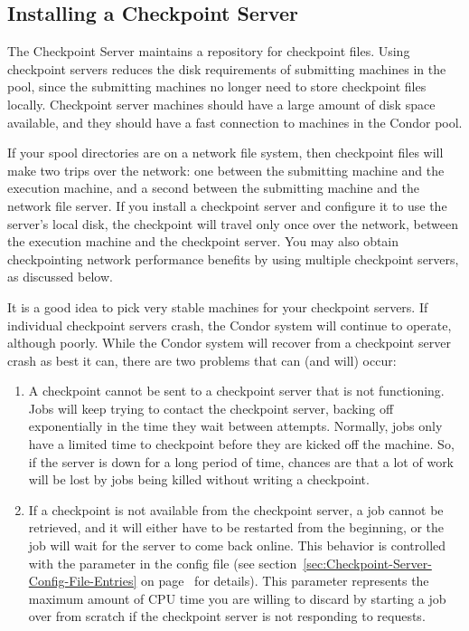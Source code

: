 \subsection{\label{sec:Ckpt-Server}
Installing a Checkpoint Server}

The Checkpoint Server maintains a repository for checkpoint files.
Using checkpoint servers reduces the disk requirements of submitting
machines in the pool, since the submitting machines no longer need to
store checkpoint files locally.
Checkpoint server machines should have a large amount of disk space
available, and they should have a fast connection to machines
in the Condor pool.

If your spool directories are on a network file system, then
checkpoint files will make two trips over the network: one between the
submitting machine and the execution machine, and a second between the
submitting machine and the network file server.
If you install a checkpoint server and configure it to use the
server's local disk, the checkpoint will travel only once over the
network, between the execution machine and the checkpoint server.
You may also obtain checkpointing network performance benefits by
using multiple checkpoint servers, as discussed below.

\Note It is a good idea to pick very stable machines for your checkpoint
servers.
If individual checkpoint servers crash, the Condor system will continue to
operate, although poorly.  
While the Condor system will recover from a checkpoint server crash
as best it can, there are two problems that can (and will) occur:
\begin{enumerate}

\item A checkpoint cannot be sent to a checkpoint server that
is not functioning.
Jobs will keep trying to contact the checkpoint server, backing
off exponentially in the time they wait between attempts.
Normally, jobs only have a limited time to checkpoint before they are
kicked off the machine.
So, if the server is down for a long period of time, chances are that
a lot of work will be lost by jobs being killed without writing a
checkpoint. 

\item If a checkpoint is not available from the checkpoint
server, a job cannot be
retrieved, and it will either have to be restarted from
the beginning, or the job will wait for the server to come back online.
This behavior is controlled with the
 parameter in the config file (see
section~\ref{sec:Checkpoint-Server-Config-File-Entries} on
page~\pageref{sec:Checkpoint-Server-Config-File-Entries} for details).
This parameter represents the maximum amount of CPU time you are
willing to discard by starting a job over from scratch if the
checkpoint server is not responding to requests.

\end{enumerate}

